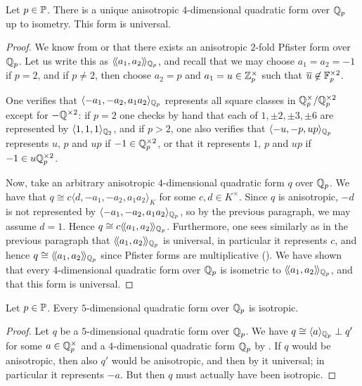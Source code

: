 \documentclass[12pt, leqno, british]{amsart}
\begin{document}
\begin{prop}\label{P:classify-4-dimensional-qqp}
Let $p \in \mathbb P$.
There is a unique anisotropic $4$-dimensional quadratic form over $\mathbb Q_p$ up to isometry.
This form is universal.
\end{prop}
\begin{proof}
We know from  or  that there exists an anisotropic $2$-fold Pfister form over $\mathbb Q_p$.
Let us write this as $\langle\!\langle a_1, a_2 \rangle\!\rangle_{\mathbb Q_p}$, and recall that we may choose $a_1 = a_2 = -1$ if $p = 2$, and if $p \neq 2$, then choose $a_2 = p$ and $a_1 = u \in \mathbb Z_p^{\times}$ such that $\overline{u} \not\in \mathbb F_p^{\times 2}$.

One verifies that $\langle -a_1, -a_2, a_1a_2 \rangle_{\mathbb Q_p}$ represents all square classes in $\mathbb Q_p^\times/\mathbb Q_p^{\times 2}$ except for $-\mathbb Q^{\times 2}$: if $p = 2$ one checks by hand that each of $1, \pm 2, \pm 3, \pm 6$ are represented by $\langle 1, 1, 1 \rangle_{\mathbb Q_2}$, and if $p > 2$, one also verifies that $\langle -u, -p, up \rangle_{\mathbb Q_p}$ represents $u$, $p$ and $up$ if $-1 \in \mathbb Q_p^{\times 2}$, or that it represents $1$, $p$ and $up$ if $-1 \in u\mathbb Q_p^{\times 2}$.

Now, take an arbitrary anisotropic $4$-dimensional quadratic form $q$ over $\mathbb Q_p$.
We have that $q \cong c\langle d, -a_1, -a_2, a_1a_2 \rangle_K$ for some $c, d \in K^\times$.
Since $q$ is anisotropic, $-d$ is not represented by $\langle -a_1, -a_2, a_1a_2 \rangle_{\mathbb Q_p}$, so by the previous paragraph, we may assume $d = 1$.
Hence $q \cong c\langle\!\langle a_1, a_2 \rangle\!\rangle_{\mathbb Q_p}$.
Furthermore, one sees similarly as in the previous paragraph that $\langle\!\langle a_1, a_2 \rangle\!\rangle_{\mathbb Q_p}$ is universal, in particular it represents $c$, and hence $q \cong \langle\!\langle a_1, a_2 \rangle\!\rangle_{\mathbb Q_p}$ since Pfister forms are multiplicative ().
We have shown that every $4$-dimensional quadratic form over $\mathbb Q_p$ is isometric to $\langle\!\langle a_1, a_2 \rangle\!\rangle_{\mathbb Q_p}$, and that this form is universal.
\end{proof}

\begin{cor}\label{C:classify-5-dimensional-qqp}
Let $p \in \mathbb P$.
Every $5$-dimensional quadratic form over $\mathbb Q_p$ is isotropic.
\end{cor}
\begin{proof}
Let $q$ be a $5$-dimensional quadratic form over $\mathbb Q_p$.
We have $q \cong \langle a \rangle_{\mathbb Q_p} \perp q'$ for some $a \in \mathbb Q_p^\times$ and a $4$-dimensional quadratic form $\mathbb Q_p$ by .
If $q$ would be anisotropic, then also $q'$ would be anisotropic, and then by  it universal; in particular it represents $-a$.
But then $q$ must actually have been isotropic.
\end{proof}
\end{document}
